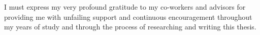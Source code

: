 \begin{thanks}
I must express my very profound gratitude to my co-workers and advisors for providing me with unfailing support and continuous encouragement throughout my years of study and through the process of researching and writing this thesis.

\end{thanks}
